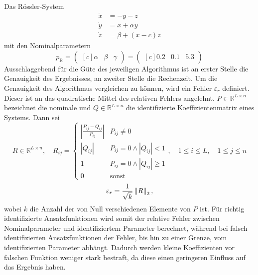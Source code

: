 Das Rössler-System
\begin{equation}
\begin{aligned}
\dot{x} &= -y-z\\
\dot{y} &= x+\alpha y\\
\dot{z} &= \beta + (x-c)z
\end{aligned}
\end{equation}
mit den Nominalparametern
\begin{equation}
p_\text{R}=	\begin{pmatrix*}[c]
				\alpha&\beta&\gamma
				\end{pmatrix*} = 
				\begin{pmatrix*}[c]
					0.2& 0.1& 5.3
				\end{pmatrix*}
\end{equation}
Ausschlaggebend für die Güte des jeweiligen Algorithmus ist an erster Stelle die Genauigkeit des Ergebnisses, an zweiter Stelle die Rechenzeit. Um die Genauigkeit des Algorithmus vergleichen zu können, wird ein Fehler $\varepsilon_r$  definiert. Dieser ist an das quadratische Mittel des relativen Fehlers angelehnt. $P\in\mathbb{R}^{L\times n}$ bezeichnet die nominale und $Q\in\mathbb{R}^{L\times n}$ die identifizierte Koeffizientenmatrix eines Systems. Dann sei
\begin{equation}
R \in\mathbb{R}^{L\times n} , \quad R_{ij}= \begin{cases}
|\frac{P_{ij}-Q_{ij}}{P_{ij}}| & P_{ij} \neq 0\\
|Q_{ij}| & P_{ij} = 0 \wedge |Q_{ij}| < 1\\
1 & P_{ij} = 0 \wedge |Q_{ij}| \geq 1\\
0 & \text{sonst}
\end{cases}, \quad  1 \leq i \leq L, \quad 1\leq j \leq n
\end{equation}
\begin{equation}
\varepsilon_r = \frac{1}{\sqrt{k}}\left\|R\right\|_2,
\end{equation} 
wobei $k$ die Anzahl der von Null verschiedenen Elemente von $P$ ist. Für richtig identifizierte Ansatzfunktionen wird somit der relative Fehler zwischen Nominalparameter und identifiziertem Parameter berechnet, während bei falsch identifizierten Ansatzfunktionen der Fehler, bis hin zu einer Grenze, vom identifizierten Parameter abhängt. Dadurch werden kleine Koeffizienten vor falschen Funktion weniger stark bestraft, da diese einen geringeren Einfluss auf das Ergebnis haben. 


